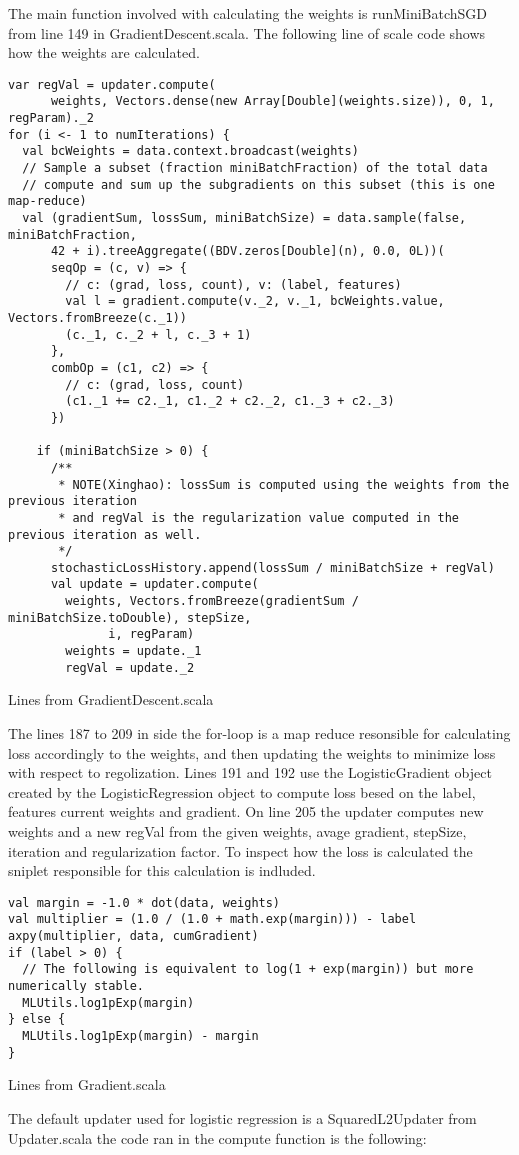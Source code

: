 The main function involved with calculating the weights is runMiniBatchSGD from line 149 in GradientDescent.scala. The following line of scale code shows how the weights are calculated. 
\begin{listing}[H]
\begin{verbatim}
var regVal = updater.compute(
      weights, Vectors.dense(new Array[Double](weights.size)), 0, 1, regParam)._2
for (i <- 1 to numIterations) {
  val bcWeights = data.context.broadcast(weights)
  // Sample a subset (fraction miniBatchFraction) of the total data
  // compute and sum up the subgradients on this subset (this is one map-reduce)
  val (gradientSum, lossSum, miniBatchSize) = data.sample(false, miniBatchFraction, 
      42 + i).treeAggregate((BDV.zeros[Double](n), 0.0, 0L))(
      seqOp = (c, v) => {
        // c: (grad, loss, count), v: (label, features)
        val l = gradient.compute(v._2, v._1, bcWeights.value, Vectors.fromBreeze(c._1))
        (c._1, c._2 + l, c._3 + 1)
      },
      combOp = (c1, c2) => {
        // c: (grad, loss, count)
        (c1._1 += c2._1, c1._2 + c2._2, c1._3 + c2._3)
      })

    if (miniBatchSize > 0) {
      /**
       * NOTE(Xinghao): lossSum is computed using the weights from the previous iteration
       * and regVal is the regularization value computed in the previous iteration as well.
       */
      stochasticLossHistory.append(lossSum / miniBatchSize + regVal)
      val update = updater.compute(
        weights, Vectors.fromBreeze(gradientSum / miniBatchSize.toDouble), stepSize,
              i, regParam)
        weights = update._1
        regVal = update._2
\end{verbatim}
\caption{Lines from GradientDescent.scala}
\label{lst:runMiniBatchSGD}
\end{listing}
The lines 187 to 209 in side the for-loop is a map reduce resonsible for calculating loss accordingly to the weights, and then updating the weights to minimize loss with respect to regolization. Lines 191 and 192 use the LogisticGradient object created by the LogisticRegression object to compute loss besed on the  label, features current weights and gradient. On line 205 the updater computes new weights and a new regVal from the given weights, avage gradient, stepSize, iteration and regularization factor.  
To inspect how the loss is calculated the sniplet responsible for this calculation is indluded. 
\begin{listing}[H]
\begin{verbatim}
val margin = -1.0 * dot(data, weights)
val multiplier = (1.0 / (1.0 + math.exp(margin))) - label
axpy(multiplier, data, cumGradient)
if (label > 0) {
  // The following is equivalent to log(1 + exp(margin)) but more numerically stable.
  MLUtils.log1pExp(margin)
} else {
  MLUtils.log1pExp(margin) - margin
} 
\end{verbatim}
\caption{Lines from Gradient.scala}
\label{lst:sparkloss}
\end{listing}
The default updater used for logistic regression is a SquaredL2Updater from Updater.scala
the code ran in the compute function is the following: 

